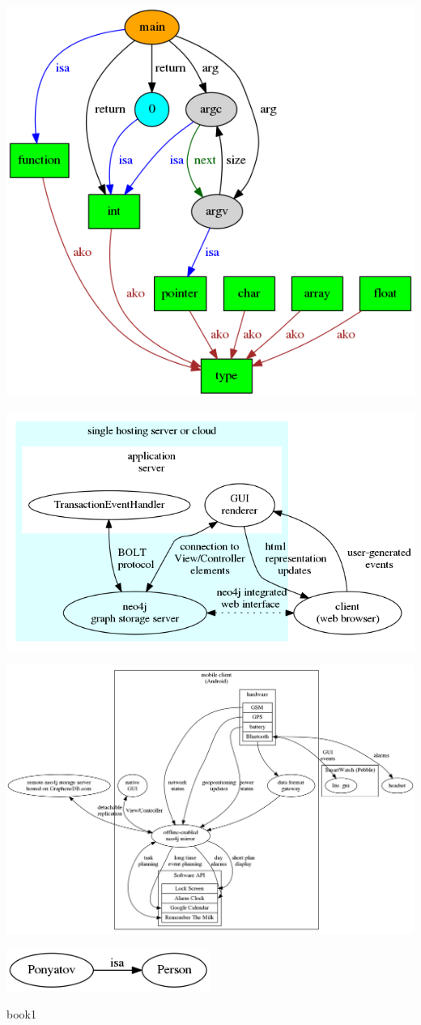 \noindent\includegraphics[width=\textwidth]{fig/hello.png}

\noindent\includegraphics[width=\textwidth]{fig/architecture.png}

\noindent\includegraphics[width=\textwidth]{fig/mobile.png}

\noindent\includegraphics[width=0.5\textwidth]{fig/person.png}

\begin{thebibliography}{99}
 book1
\end{thebibliography}



